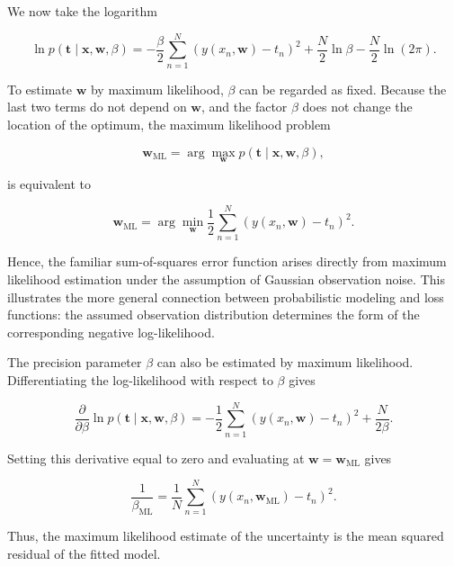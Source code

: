 \documentclass[10pt,twocolumn]{memoir}
\begin{document}
We now take the logarithm

\begin{equation}
    \ln p(\mathbf{t}\mid\mathbf{x},\mathbf{w},\beta) = -\frac{\beta}{2}\sum_{n=1}^{N}\left(y(x_n,\mathbf{w})-t_n\right)^2 + \frac{N}{2}\ln\beta - \frac{N}{2}\ln(2\pi).
\label{eq:c1_gaussian_log_likelihood}
\end{equation}

To estimate $\mathbf{w}$ by maximum likelihood, $\beta$ can be regarded as fixed. Because the last two terms do not depend on $\mathbf{w}$, and the factor $\beta$ does not change the location of the optimum, the maximum likelihood problem

\begin{equation}
    \mathbf{w}_{\mathrm{ML}} = \arg\max_{\mathbf{w}}p(\mathbf{t}\mid\mathbf{x},\mathbf{w},\beta),
\end{equation}

is equivalent to

\begin{equation}
    \mathbf{w}_{\mathrm{ML}} = \arg\min_{\mathbf{w}}\frac{1}{2}\sum_{n=1}^{N}\left(y(x_n,\mathbf{w})-t_n\right)^2.
\end{equation}

Hence, the familiar sum-of-squares error function arises directly from maximum likelihood estimation under the assumption of Gaussian observation noise. This illustrates the more general connection between probabilistic modeling and loss functions: the assumed observation distribution determines the form of the corresponding negative log-likelihood.

The precision parameter $\beta$ can also be estimated by maximum likelihood. Differentiating the log-likelihood with respect to $\beta$ gives

\begin{equation}
    \frac{\partial}{\partial\beta}\ln p(\mathbf{t}\mid\mathbf{x},\mathbf{w},\beta) = -\frac{1}{2}\sum_{n=1}^{N}\left(y(x_n,\mathbf{w})-t_n\right)^2 + \frac{N}{2\beta}.
\end{equation}

Setting this derivative equal to zero and evaluating at $\mathbf{w}=\mathbf{w}_{\mathrm{ML}}$ gives

\begin{equation}
    \frac{1}{\beta_{\mathrm{ML}}} = \frac{1}{N}\sum_{n=1}^{N}\left(y(x_n,\mathbf{w}_{\mathrm{ML}}) - t_n\right)^2.
\end{equation}

Thus, the maximum likelihood estimate of the uncertainty is the mean squared residual of the fitted model.
\end{document}
